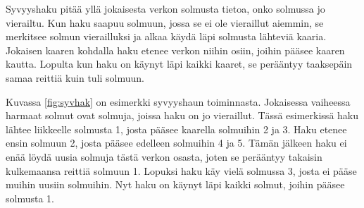 Syvyyshaku pitää yllä jokaisesta verkon solmusta tietoa,
onko solmussa jo vierailtu.
Kun haku saapuu solmuun, jossa se ei ole vieraillut aiemmin,
se merkitsee solmun vierailluksi ja alkaa käydä
läpi solmusta lähteviä kaaria.
Jokaisen kaaren kohdalla haku etenee verkon niihin osiin,
joihin pääsee kaaren kautta.
Lopulta kun haku on käynyt läpi kaikki kaaret,
se perääntyy taaksepäin samaa reittiä kuin tuli solmuun.

Kuvassa \ref{fig:syvhak} on esimerkki syvyyshaun toiminnasta.
Jokaisessa vaiheessa harmaat solmut ovat solmuja,
joissa haku on jo vieraillut.
Tässä esimerkissä haku lähtee liikkeelle solmusta 1,
josta pääsee kaarella solmuihin 2 ja 3.
Haku etenee ensin solmuun 2, josta pääsee edelleen
solmuihin 4 ja 5.
Tämän jälkeen haku ei enää löydä uusia solmuja
tästä verkon osasta, joten se perääntyy takaisin
kulkemaansa reittiä solmuun 1.
Lopuksi haku käy vielä solmussa 3,
josta ei pääse muihin uusiin solmuihin.
Nyt haku on käynyt läpi kaikki solmut,
joihin pääsee solmusta 1.

